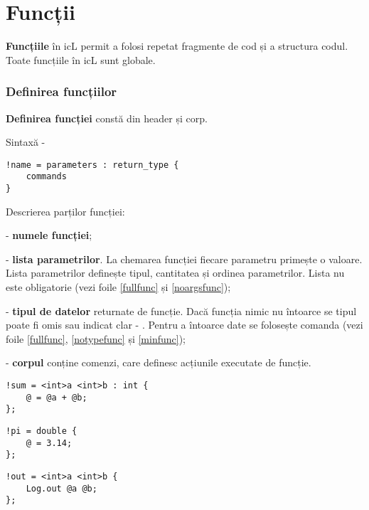 \section{Funcții}

{\bf Funcțiile} în icL permit a folosi repetat fragmente de cod și a structura codul. Toate funcțiile în icL sunt globale.

\subsubsection{Definirea funcțiilor}

{\bf Definirea funcției} constă din header și corp.

\noindent Sintaxă -
\begin{lstlisting}[numbers=none]
!name = parameters : return_type {
	commands
}
\end{lstlisting}

Descrierea parților funcției:
\begin{icItems}
\item
	 - {\bf numele funcției};
\item
	 - {\bf lista parametrilor}. La chemarea funcției fiecare parametru primește o valoare. Lista parametrilor definește tipul, cantitatea și ordinea parametrilor. Lista nu este obligatorie (vezi foile \ref{fullfunc} și \ref{noargsfunc});
\item
	 - {\bf tipul de datelor} returnate de funcție. Dacă funcția nimic nu întoarce se tipul poate fi omis sau indicat clar - \void{}. Pentru a întoarce date se folosește comanda  (vezi foile \ref{fullfunc}, \ref{notypefunc} și \ref{minfunc});
\item
	 - {\bf corpul} conține comenzi, care definesc acțiunile executate de funcție.
\end{icItems}

\begin{lstlisting}[caption=Funcție completă, label=fullfunc]
!sum = <int>a <int>b : int {
	@ = @a + @b;
};
\end{lstlisting}

\begin{lstlisting}[caption=Funcție fără argumente, label=noargsfunc]
!pi = double {
	@ = 3.14;
};
\end{lstlisting}

\begin{lstlisting}[caption=Funcție făra tip de date, label=notypefunc]
!out = <int>a <int>b {
	Log.out @a @b;
};
\end{lstlisting}

